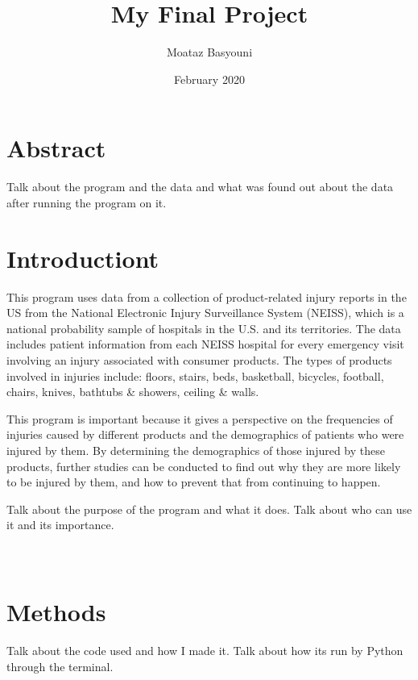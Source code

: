 \documentclass{article}
\title{My Final Project}
\author{Moataz Basyouni}
\date {February 2020}
\begin{document}
\maketitle

\section{Abstract}
Talk about the program and the data and what was found out about the data after running the program on it.
\newpage

\tableofcontents
\listoffigures
\newpage

\section{Introductiont}
This program uses data from a collection of product-related injury reports in the US from the National Electronic Injury Surveillance System (NEISS), which is a national probability sample of hospitals in the U.S. and its territories. The data includes patient information from each NEISS hospital for every emergency visit involving an injury associated with consumer products. The types of products involved in injuries include: floors, stairs, beds, basketball, bicycles, football, chairs, knives, bathtubs & showers, ceiling & walls.

This program is important because it gives a perspective on the frequencies of injuries caused by different products and the demographics of patients who were injured by them. By determining the demographics of those injured by these products, further studies can be conducted to find out why they are more likely to be injured by them, and how to prevent that from continuing to happen.

Talk about the purpose of the program and what it does. Talk about who can use it and its importance.\\\\\\


\section{Methods}
Talk about the code used and how I made it. Talk about how its run by Python through the terminal.\\
\end{document}
